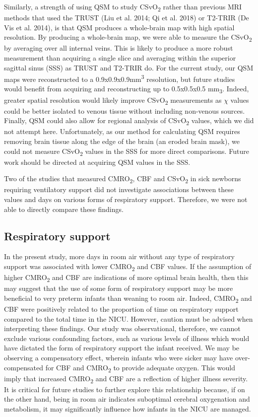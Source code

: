 \documentclass[
  letterpaper,
  DIV=11,
  numbers=noendperiod]{scrartcl}
\begin{document}
Similarly, a strength of using QSM to study CSvO\textsubscript{2} rather
than previous MRI methods that used the TRUST (Liu et al. 2014; Qi et
al. 2018) or T2-TRIR (De Vis et al. 2014), is that QSM produces a
whole-brain map with high spatial resolution. By producing a whole-brain
map, we were able to measure the CSvO\textsubscript{2} by averaging over
all internal veins. This is likely to produce a more robust measurement
than acquiring a single slice and averaging within the superior sagittal
sinus (SSS) as TRUST and T2-TRIR do. For the current study, our QSM maps
were reconstructed to a 0.9x0.9x0.9mm\textsuperscript{3} resolution, but
future studies would benefit from acquiring and reconstructing up to
0.5x0.5x0.5 mm\textsubscript{3}. Indeed, greater spatial resolution
would likely improve CSvO\textsubscript{2} measurements as \(\chi\)
values could be better isolated to venous tissue without including
non-venous sources. Finally, QSM could also allow for regional analysis
of CSvO\textsubscript{2} values, which we did not attempt here.
Unfortunately, as our method for calculating QSM requires removing brain
tissue along the edge of the brain (an eroded brain mask), we could not
measure CSvO\textsubscript{2} values in the SSS for more direct
comparisons. Future work should be directed at acquiring QSM values in
the SSS.

Two of the studies that measured CMRO\textsubscript{2}, CBF and
CSvO\textsubscript{2} in sick newborns requiring ventilatory support did
not investigate associations between these values and days on various
forms of respiratory support. Therefore, we were not able to directly
compare these findings.

\subsection{Respiratory support}\label{respiratory-support}

In the present study, more days in room air without any type of
respiratory support was associated with lower CMRO\textsubscript{2} and
CBF values. If the assumption of higher CMRO\textsubscript{2} and CBF
are indications of more optimal brain health, then this may suggest that
the use of some form of respiratory support may be more beneficial to
very preterm infants than weaning to room air. Indeed,
CMRO\textsubscript{2} and CBF were positively related to the proportion
of time on respiratory support compared to the total time in the NICU.
However, caution must be advised when interpreting these findings. Our
study was observational, therefore, we cannot exclude various
confounding factors, such as various levels of illness which would have
dictated the form of respiratory support the infant received. We may be
observing a compensatory effect, wherein infants who were sicker may
have over-compensated for CBF and CMRO\textsubscript{2} to provide
adequate oxygen. This would imply that increased CMRO\textsubscript{2}
and CBF are a reflection of higher illness severity. It is critical for
future studies to further explore this relationship because, if on the
other hand, being in room air indicates suboptimal cerebral oxygenation
and metabolism, it may significantly influence how infants in the NICU
are managed.
\end{document}
